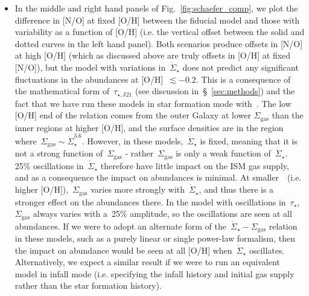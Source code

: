 \documentclass[ms.tex]{subfiles}
\begin{document}
\begin{itemize}
	\item In the middle and right hand panels of Fig.~\ref{fig:schaefer_comp}, 
	we plot the difference in [N/O] at fixed [O/H] between the fiducial model 
	and those with variability as a function of [O/H] (i.e. the vertical 
	offset between the solid and dotted curves in the left hand panel). 
	Both scenarios produce offsets in [N/O] at high [O/H] (which as discussed 
	above are truly offsets in [O/H] at fixed [N/O]), but the model with 
	variations in~$\dot{\Sigma}_\star$ does not predict any significant 
	fluctuations in the abundances at [O/H]~$\lesssim -0.2$. 
	This is a consequence of the mathematical form of~$\tau_{\star,\text{J21}}$ 
	(see discussion in~\S~\ref{sec:methods}) and the fact that we 
	have run these models in star formation mode with~\vice. 
	The low [O/H] end of the relation comes from the outer Galaxy at lower 
	$\Sigma_\text{gas}$ than the inner regions at higher [O/H], and the surface 
	densities are in the region where~$\Sigma_\text{gas} 
	\sim \dot{\Sigma}_\star^{3.6}$. 
	However, in these models,~$\dot{\Sigma}_\star$ is fixed, meaning that it is 
	not a strong function of~$\Sigma_\text{gas}$ - rather~$\Sigma_\text{gas}$ 
	is only a weak function of~$\dot{\Sigma}_\star$. 
	25\% oscillations in~$\dot{\Sigma}_\star$ therefore have little impact on 
	the ISM gas supply, and as a consequence the impact on abundances is 
	minimal. 
	At smaller~\rgal~(i.e. higher [O/H]),~$\Sigma_\text{gas}$ varies more 
	strongly with~$\dot{\Sigma}_\star$, and thus there is a stronger effect on 
	the abundances there. 
	In the model with oscillations in~$\tau_\star$,~$\Sigma_\text{gas}$ always 
	varies with a~25\% amplitude, so the oscillations are seen at all 
	abundances. 
	If we were to adopt an alternate form of the~$\dot{\Sigma}_\star - 
	\Sigma_\text{gas}$ relation in these models, such as a purely linear or 
	single power-law formalism, then the impact on abundance would be seen at 
	all [O/H] when~$\dot{\Sigma}_\star$ oscillates. 
	Alternatively, we expect a similar result if we were to run an equivalent 
	model in infall mode (i.e. specifying the infall history and initial gas 
	supply rather than the star formation history). 


\end{itemize}
\end{document}
